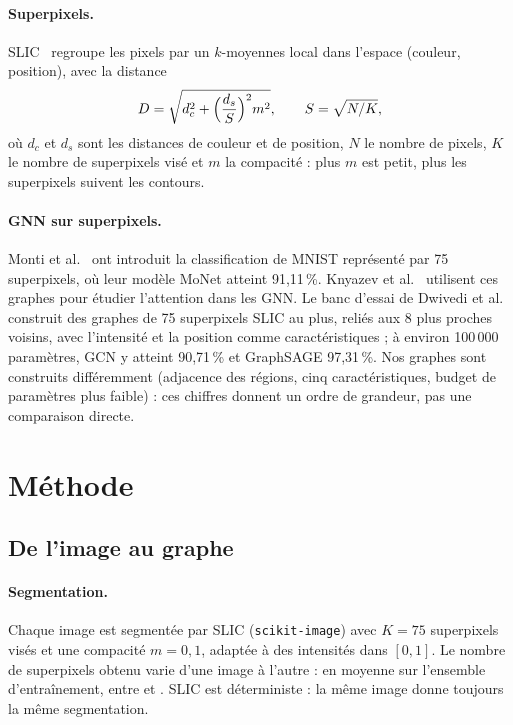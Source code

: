 \documentclass[11pt,a4paper]{article}
\newcommand{\pct}{\,\%}
\begin{document}
\paragraph{Superpixels.} SLIC~\cite{achanta2012} regroupe les pixels par un $k$-moyennes local dans l'espace
(couleur, position), avec la distance
\begin{equation}
D = \sqrt{d_c^2 + \Bigl(\frac{d_s}{S}\Bigr)^2 m^2},\qquad S = \sqrt{N/K},
\end{equation}
où $d_c$ et $d_s$ sont les distances de couleur et de position, $N$ le nombre de pixels, $K$ le nombre de superpixels
visé et $m$ la compacité : plus $m$ est petit, plus les superpixels suivent les contours.

\paragraph{GNN sur superpixels.} Monti et al.~\cite{monti2017} ont introduit la classification de MNIST représenté
par 75 superpixels, où leur modèle MoNet atteint 91,11\pct. Knyazev et al.~\cite{knyazev2019} utilisent ces graphes
pour étudier l'attention dans les GNN. Le banc d'essai de Dwivedi et al.~\cite{dwivedi2023} construit des graphes de
75 superpixels SLIC au plus, reliés aux 8 plus proches voisins, avec l'intensité et la position comme caractéristiques ;
à environ 100\,000 paramètres, GCN y atteint 90,71\pct{} et GraphSAGE 97,31\pct. Nos graphes sont construits
différemment (adjacence des régions, cinq caractéristiques, budget de paramètres plus faible) : ces chiffres donnent
un ordre de grandeur, pas une comparaison directe.

\section{Méthode}

\subsection{De l'image au graphe}

\paragraph{Segmentation.} Chaque image est segmentée par SLIC (\texttt{scikit-image}) avec $K = 75$ superpixels visés
et une compacité $m = 0{,}1$, adaptée à des intensités dans $[0,1]$. Le nombre de superpixels obtenu varie d'une image
à l'autre : \nodesmean{} en moyenne sur l'ensemble d'entraînement, entre \nodesmin{} et \nodesmax.
SLIC est déterministe : la même image donne toujours la même segmentation.
\end{document}
